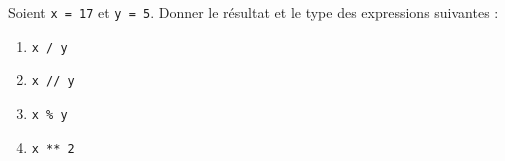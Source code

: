 \begin{exo}
	Soient \lstinline|x = 17| et \lstinline|y = 5|. Donner le résultat et le type des expressions suivantes :
	\begin{enumerate}[label=\alph*)]
		\item \lstinline|x / y|
		\item \lstinline|x // y|
		\item \lstinline|x % y|
		\item \lstinline|x ** 2|
	\end{enumerate}
\end{exo}
